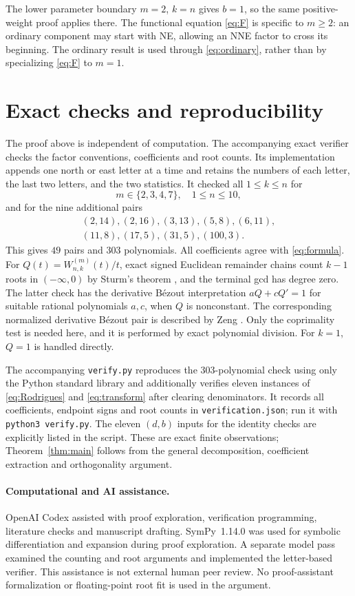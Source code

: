 \documentclass[11pt]{article}
\newcommand{\W}{W^{(m)}_{n,k}}
\begin{document}
The lower parameter boundary $m=2$, $k=n$ gives $b=1$, so the same
positive-weight proof applies there. The functional equation
\eqref{eq:F} is specific to $m\geq2$: an ordinary component may start
with NE, allowing an NNE factor to cross its beginning. The ordinary
result is used through \eqref{eq:ordinary}, rather than by specializing
\eqref{eq:F} to $m=1$.

\section{Exact checks and reproducibility}

The proof above is independent of computation. The accompanying exact
verifier checks the factor conventions, coefficients and root counts.
Its implementation appends one north or east letter at a time and
retains the numbers of each letter, the last two letters, and the two
statistics. It checked all $1\leq k\leq n$ for
\[
 m\in\{2,3,4,7\},\quad 1\leq n\leq10,
\]
and for the nine additional pairs
\[
\begin{gathered}
 (2,14),(2,16),(3,13),(5,8),(6,11),\\
 (11,8),(17,5),(31,5),(100,3).
\end{gathered}
\]
This gives $49$ pairs and $303$ polynomials. All coefficients agree with
\eqref{eq:formula}. For $Q(t)=\W(t)/t$, exact signed Euclidean remainder
chains count $k-1$ roots in $(-\infty,0)$ by Sturm's theorem
\cite[Theorem~2.50]{BasuPollackRoy2006}, and the terminal gcd has degree
zero. The latter check has the derivative Bézout interpretation
$aQ+cQ'=1$ for suitable rational polynomials $a,c$, when $Q$ is
nonconstant. The corresponding normalized derivative Bézout pair is
described by Zeng \cite[Eq.~(1) and Lemma~2.1]{Zeng2026Bezout}.
Only the coprimality test is needed here, and it is performed
by exact polynomial division. For $k=1$, $Q=1$ is handled directly.

The accompanying \texttt{verify.py} reproduces the $303$-polynomial
check using only the Python standard library and additionally verifies
eleven instances of \eqref{eq:Rodrigues} and \eqref{eq:transform} after
clearing denominators. It records all coefficients, endpoint signs and
root counts in \texttt{verification.json}; run it with
\texttt{python3 verify.py}. The eleven $(d,b)$ inputs for the identity
checks are explicitly listed in the script.
These are exact finite observations; Theorem~\ref{thm:main} follows from
the general decomposition, coefficient extraction and orthogonality
argument.

\paragraph{Computational and AI assistance.}
OpenAI Codex assisted with proof exploration, verification programming,
literature checks and manuscript drafting. SymPy~1.14.0
\cite{MeurerEtAl2017} was used for symbolic differentiation and expansion
during proof exploration. A separate model pass examined
the counting and root arguments and implemented the letter-based verifier.
This assistance is not external human peer review. No proof-assistant
formalization or floating-point root fit is used in the argument.



\end{document}
